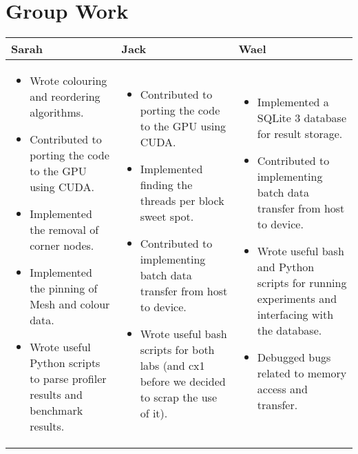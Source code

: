 \section{Group Work}
\begin{tabular}{|p{5.5cm}| p{5.5cm} | p{5.5cm} |}
  \hline
  Sarah & Jack & Wael\\
  \hline
  \hline
  \begin{itemize}
    \item Wrote colouring and reordering algorithms.
    \item Contributed to porting the code to the GPU using CUDA.
    \item Implemented the removal of corner nodes.
    \item Implemented the pinning of Mesh and colour data.
    \item Wrote useful Python scripts to parse profiler results and benchmark results.
  \end{itemize} &

  \begin{itemize}
    \item Contributed to porting the code to the GPU using CUDA.
    \item Implemented finding the threads per block sweet spot.
    \item Contributed to implementing batch data transfer from host to device.
    \item Wrote useful bash scripts for both labs (and cx1 before we decided to scrap the use of it).
  \end{itemize} &

  \begin{itemize}
    \item Implemented a SQLite 3 database for result storage.
    \item Contributed to implementing batch data transfer from host to device.
    \item Wrote useful bash and Python scripts for running experiments and interfacing with the database.
    \item Debugged bugs related to memory access and transfer.
  \end{itemize} \\
  \hline
\end{tabular}
